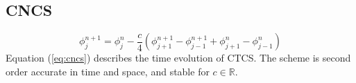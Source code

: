 \subsection{CNCS}
\begin{equation}
\phi_j^{n+1}=\phi_j^{n}-\frac{c}{4}(\phi_{j+1}^{n+1}-\phi_{j-1}^{n+1}+\phi_{j+1}^{n}-\phi_{j-1}^{n})
\label{eq:cncs}
\end{equation}
Equation (\ref{eq:cncs}) describes the time evolution of CTCS. The scheme is second order accurate in time and space, and stable for $c\in\mathbb{R}$.

